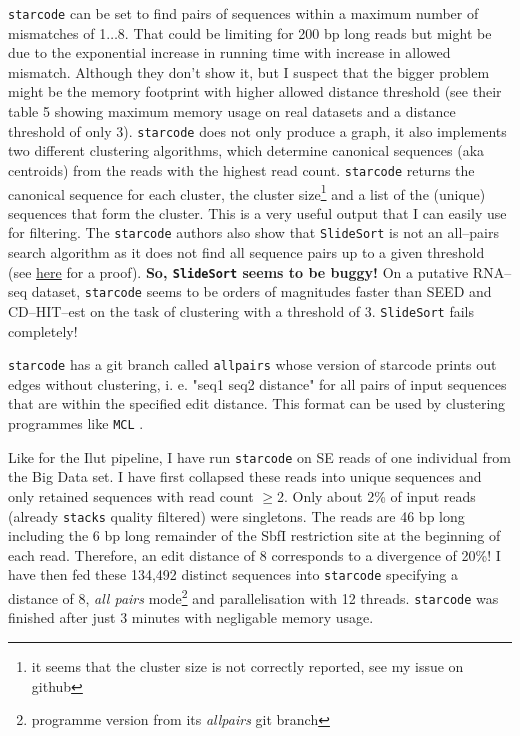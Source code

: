 \documentclass{article}\usepackage[]{graphicx}\usepackage[]{color}
\begin{document}
\texttt{starcode} can be set to find pairs of sequences within a maximum number of mismatches of 1$\dots$8. That could be limiting for 200 bp long reads but might be due to the exponential increase in running time with increase in allowed mismatch. Although they don't show it, but I suspect that the bigger problem might be the memory footprint with higher allowed distance threshold (see their table 5 showing maximum memory usage on real datasets and a distance threshold of only 3). \texttt{starcode} does not only produce a graph, it also implements two different clustering algorithms, which determine canonical sequences (aka centroids) from the reads with the highest read count. \texttt{starcode} returns the canonical sequence for each cluster, the cluster size\footnote{it seems that the cluster size is not correctly reported, see my issue on github} and a list of the (unique) sequences that form the cluster. This is a very useful output that I can easily use for filtering. The \texttt{starcode} authors also show that \texttt{SlideSort} is not an all--pairs search algorithm as it does not find all sequence pairs up to a given threshold (see \href{https://github.com/gui11aume/starcode/tree/master/misc}{here} for a proof). {\bfseries So, \texttt{SlideSort} seems to be buggy!} On a putative RNA--seq dataset, \texttt{starcode} seems to be orders of magnitudes faster than SEED and CD--HIT--est on the task of clustering with a threshold of 3. \texttt{SlideSort} fails completely! 

\texttt{starcode} has a git branch called \texttt{allpairs} whose version of starcode prints out edges without clustering, i. e. "seq1 seq2 distance" for all pairs of input sequences that are within the specified edit distance. This format can be used by clustering programmes like \texttt{MCL} .

Like for the Ilut pipeline, I have run \texttt{starcode} on SE reads of one individual from the Big Data set. I have first collapsed these reads into unique sequences and only retained sequences with read count $\ge$2. Only about 2\% of input reads (already \texttt{stacks} quality filtered) were singletons. The reads are 46 bp long including the 6 bp long remainder of the SbfI restriction site at the beginning of each read. Therefore, an edit distance of 8 corresponds to a divergence of 20\%! I have then fed these 134,492 distinct sequences into \texttt{starcode} specifying a distance of 8, \emph{all pairs} mode\footnote{programme version from its \emph{allpairs} git branch} and parallelisation with 12 threads. \texttt{starcode} was finished after just 3 minutes with negligable memory usage. 
\end{document}
